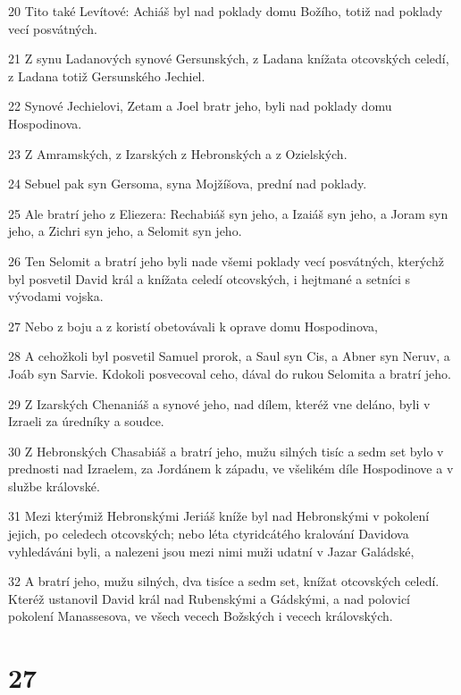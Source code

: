 \par 20 Tito také Levítové: Achiáš byl nad poklady domu Božího, totiž nad poklady vecí posvátných.
\par 21 Z synu Ladanových synové Gersunských, z Ladana knížata otcovských celedí, z Ladana totiž Gersunského Jechiel.
\par 22 Synové Jechielovi, Zetam a Joel bratr jeho, byli nad poklady domu Hospodinova.
\par 23 Z Amramských, z Izarských z Hebronských a z Ozielských.
\par 24 Sebuel pak syn Gersoma, syna Mojžíšova, prední nad poklady.
\par 25 Ale bratrí jeho z Eliezera: Rechabiáš syn jeho, a Izaiáš syn jeho, a Joram syn jeho, a Zichri syn jeho, a Selomit syn jeho.
\par 26 Ten Selomit a bratrí jeho byli nade všemi poklady vecí posvátných, kterýchž byl posvetil David král a knížata celedí otcovských, i hejtmané a setníci s vývodami vojska.
\par 27 Nebo z boju a z koristí obetovávali k oprave domu Hospodinova,
\par 28 A cehožkoli byl posvetil Samuel prorok, a Saul syn Cis, a Abner syn Neruv, a Joáb syn Sarvie. Kdokoli posvecoval ceho, dával do rukou Selomita a bratrí jeho.
\par 29 Z Izarských Chenaniáš a synové jeho, nad dílem, kteréž vne deláno, byli v Izraeli za úredníky a soudce.
\par 30 Z Hebronských Chasabiáš a bratrí jeho, mužu silných tisíc a sedm set bylo v prednosti nad Izraelem, za Jordánem k západu, ve všelikém díle Hospodinove a v službe královské.
\par 31 Mezi kterýmiž Hebronskými Jeriáš kníže byl nad Hebronskými v pokolení jejich, po celedech otcovských; nebo léta ctyridcátého kralování Davidova vyhledáváni byli, a nalezeni jsou mezi nimi muži udatní v Jazar Galádské,
\par 32 A bratrí jeho, mužu silných, dva tisíce a sedm set, knížat otcovských celedí. Kteréž ustanovil David král nad Rubenskými a Gádskými, a nad polovicí pokolení Manassesova, ve všech vecech Božských i vecech královských.

\chapter{27}


